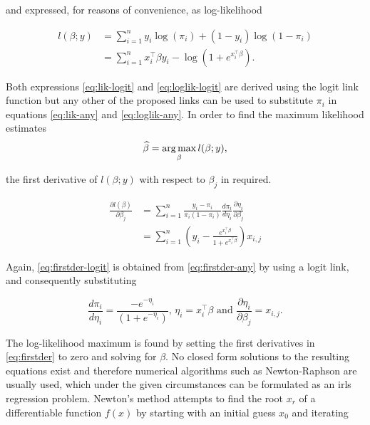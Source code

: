 and expressed, for reasons of convenience, as log-likelihood

\begin{subequations}
\begin{align}
  l(\beta; y) &= \sum_{i=1}^n y_i \log(\pi_i) + (1-y_i) \log(1-\pi_i) \label{eq:loglik-any} \\
  &= \sum_{i=1}^n x_i^\intercal \beta y_i -  \log\left(1+e^{x_i^\intercal \beta}\right). \label{eq:loglik-logit}
\end{align}
\end{subequations}

Both expressions \ref{eq:lik-logit} and \ref{eq:loglik-logit} are derived using the logit link function but any other of the proposed links can be used to substitute $\pi_i$ in equations \ref{eq:lik-any} and \ref{eq:loglik-any}. In order to find the maximum likelihood estimates
\begin{equation}
\widehat{\beta} = \operatorname*{arg\, max}_{\beta} l(\beta; y), 
\end{equation}

the first derivative of $l(\beta; y)$ with respect to $\beta_j$ in required.

\begin{subequations}\label{eq:firstder}
\begin{align}
  \frac{\partial l(\beta)}{\partial \beta_j} &= \sum_{i=1}^n \frac{y_i - \pi_i}{\pi_i (1-\pi_i)} \frac{d \pi_i}{d \eta_i} \frac{\partial \eta_i}{\partial \beta_j} \label{eq:firstder-any} \\
  &= \sum_{i=1}^n \left(y_i - \frac{e^{x_i^\intercal \beta}}{1+e^{x_i^\intercal \beta}}\right) x_{i,j} \label{eq:firstder-logit}
\end{align}
\end{subequations}

Again, \ref{eq:firstder-logit} is obtained from \ref{eq:firstder-any} by using a logit link, and consequently substituting 

\begin{equation*}
  \frac{d \pi_i}{d \eta_i} = \frac{-e^{-\eta_i}}{(1+e^{-\eta_i})} \text{,\ \ } \eta_i = x_i^\intercal \beta \text{\ \ and\ \ } \frac{\partial \eta_i}{\partial \beta_j} = x_{i,j}.
\end{equation*}

The log-likelihood maximum is found by setting the first derivatives in \ref{eq:firstder} to zero and solving for $\beta$. No closed form solutions to the resulting equations exist and therefore numerical algorithms such as Newton-Raphson are usually used, which under the given circumstances can be formulated as an \gls{irls} regression problem. Newton's method attempts to find the root $x_r$ of a differentiable function $f(x)$ by starting with an initial guess $x_0$ and iterating


